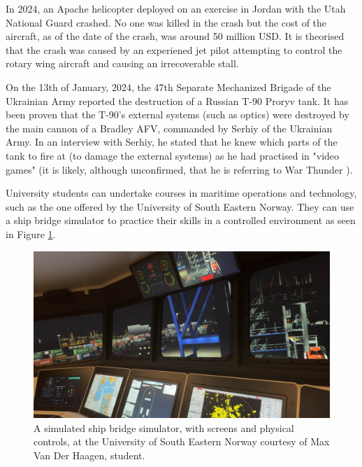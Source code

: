 \documentclass[12pt]{article}
\begin{document}
In 2024, an Apache helicopter deployed on an exercise in Jordan with the Utah National Guard crashed. \cite{intergalactic2024} No one was killed in the crash but the cost of the aircraft, as of the date of the crash, was around 50 million USD. \cite{cbsaustin2024} It is theorised that the crash was caused by an experiened jet pilot attempting to control the rotary wing aircraft and causing an irrecoverable stall. \cite{carlisle2024}

On the 13th of January, 2024, the 47th Separate Mechanized Brigade of the Ukrainian Army reported the destruction of a Russian T-90 Proryv tank. \cite{malyasov2024} It has been proven that the T-90's external systems (such as optics) were destroyed by the main cannon of a Bradley AFV, commanded by Serhiy of the Ukrainian Army. In an interview with Serhiy, he stated that he knew which parts of the tank to fire at (to damage the external systems) as he had practised in "video games" \cite{militaryconflict2025} (it is likely, although unconfirmed, that he is referring to War Thunder \cite{warthunder}).

University students can undertake courses in maritime operations and technology, such as the one offered by the University of South Eastern Norway. They can use a ship bridge simulator to practice their skills in a controlled environment as seen in Figure \ref{fig:maxvdhnorway}.

\begin{figure}[h]
  \centering
  \begin{minipage}[b]{0.9\linewidth}
    \includegraphics[width=\linewidth]{images/max_vdh_norway.jpg}
    \caption{A simulated ship bridge simulator, with screens and physical controls, at the University of South Eastern Norway courtesy of Max Van Der Haagen, student.}
    \label{fig:maxvdhnorway}
  \end{minipage}
\end{figure}
\end{document}
